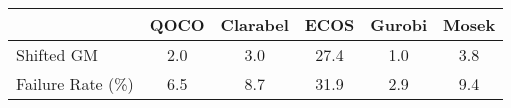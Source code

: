 \begin{tabular}{lccccc}
  \hline
   & \textbf{QOCO} & \textbf{Clarabel} & \textbf{ECOS} & \textbf{Gurobi} & \textbf{Mosek} \\ \hline
  Shifted GM & 2.0 & 3.0 & 27.4 & 1.0 & 3.8 \\ 
  Failure Rate (\%) & 6.5 & 8.7 & 31.9 & 2.9 & 9.4 \\ \hline 
\end{tabular}
